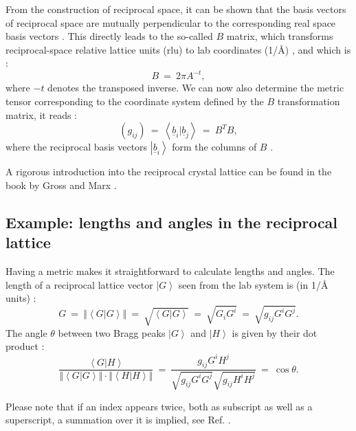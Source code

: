 From the construction of reciprocal space, it can be shown that the basis vectors of reciprocal space
are mutually perpendicular to the corresponding real space basis vectors \cite[p. 60]{Gross2012}.
This directly leads to the so-called $B$ matrix, which transforms reciprocal-space relative lattice units (rlu)
to lab coordinates (1/\AA) \cite{Lumsden2005}, and which is \cite[p. 60]{Gross2012}:
\begin{equation} B \ =\  2 \pi A^{-t}, \end{equation}
where $-t$ denotes the transposed inverse.
We can now also determine the metric tensor \cite[pp. 807-809]{Arens2015} corresponding to the coordinate
system defined by the $B$ transformation matrix, it reads \cite[p. 808]{Arens2015}:
\begin{equation}
	\left(g_{ij}\right) \ =\  \left<\underline{b}_i | \underline{b}_j \right> \ =\  B^T B,
\end{equation}
where the reciprocal basis vectors $\left| \underline{b}_i \right>$ form the columns of $B$ \cite[p. 631]{Arens2015}.

A rigorous introduction into the reciprocal crystal lattice can be found in the book by Gross
and Marx \cite[pp. 58 - 67]{Gross2012}.


\subsection{Example: lengths and angles in the reciprocal lattice}
Having a metric makes it straightforward to calculate lengths and angles.
The length of a reciprocal lattice vector $\left| G \right>$ seen from the lab system is 
(in 1/\AA{} units) \cite[p. 808]{Arens2015}:
\begin{equation}
	G  \ =\ 
	\left\Vert \left< G | G \right> \right\Vert \ =\  \sqrt{\left< G | G \right>}
		\ =\  \sqrt{G_i G^i} \ =\  \sqrt{g_{ij} G^i G^j}.
\end{equation}
The angle $\theta$ between two Bragg peaks $\left| G \right>$ and $\left| H \right>$ 
is given by their dot product \cite[p. 808]{Arens2015}:
\begin{equation}
	\frac{\left< G | H \right>}{\left\Vert \left< G | G \right> \right\Vert
		\cdot \left\Vert \left< H | H \right> \right\Vert} \ =\
	\frac{g_{ij} G^i H^j }{\sqrt{g_{ij} G^i G^j} \sqrt{g_{ij} H^i H^j}} \ =\  \cos \theta.
\end{equation}

Please note that if an index appears twice, both as subscript as well as a superscript, 
a summation over it is implied, see Ref. \cite{wiki_summation}.


